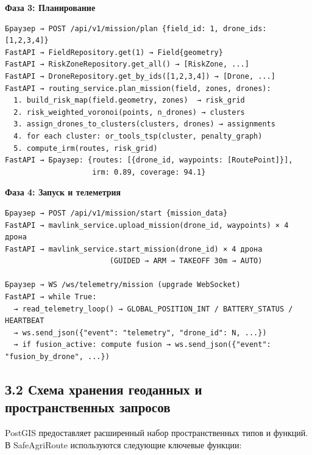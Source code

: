 \documentclass[14pt,a4paper]{extarticle}
\begin{document}
\textbf{Фаза 3: Планирование}

\begin{verbatim}
Браузер → POST /api/v1/mission/plan {field_id: 1, drone_ids: [1,2,3,4]}
FastAPI → FieldRepository.get(1) → Field{geometry}
FastAPI → RiskZoneRepository.get_all() → [RiskZone, ...]
FastAPI → DroneRepository.get_by_ids([1,2,3,4]) → [Drone, ...]
FastAPI → routing_service.plan_mission(field, zones, drones):
  1. build_risk_map(field.geometry, zones)  → risk_grid
  2. risk_weighted_voronoi(points, n_drones) → clusters
  3. assign_drones_to_clusters(clusters, drones) → assignments
  4. for each cluster: or_tools_tsp(cluster, penalty_graph)
  5. compute_irm(routes, risk_grid)
FastAPI → Браузер: {routes: [{drone_id, waypoints: [RoutePoint]}],
                    irm: 0.89, coverage: 94.1}
\end{verbatim}

\textbf{Фаза 4: Запуск и телеметрия}

\begin{verbatim}
Браузер → POST /api/v1/mission/start {mission_data}
FastAPI → mavlink_service.upload_mission(drone_id, waypoints) × 4 дрона
FastAPI → mavlink_service.start_mission(drone_id) × 4 дрона
                        (GUIDED → ARM → TAKEOFF 30m → AUTO)

Браузер → WS /ws/telemetry/mission (upgrade WebSocket)
FastAPI → while True:
  → read_telemetry_loop() → GLOBAL_POSITION_INT / BATTERY_STATUS / HEARTBEAT
  → ws.send_json({"event": "telemetry", "drone_id": N, ...})
  → if fusion_active: compute fusion → ws.send_json({"event": "fusion_by_drone", ...})
\end{verbatim}

\hypertarget{ux437.2-ux441ux445ux435ux43cux430-ux445ux440ux430ux43dux435ux43dux438ux44f-ux433ux435ux43eux434ux430ux43dux43dux44bux445-ux438-ux43fux440ux43eux441ux442ux440ux430ux43dux441ux442ux432ux435ux43dux43dux44bux445-ux437ux430ux43fux440ux43eux441ux43eux432}{%
\subsection{З.2 Схема хранения геоданных и пространственных запросов}\label{ux437.2-ux441ux445ux435ux43cux430-ux445ux440ux430ux43dux435ux43dux438ux44f-ux433ux435ux43eux434ux430ux43dux43dux44bux445-ux438-ux43fux440ux43eux441ux442ux440ux430ux43dux441ux442ux432ux435ux43dux43dux44bux445-ux437ux430ux43fux440ux43eux441ux43eux432}}

PostGIS предоставляет расширенный набор пространственных типов и функций. В SafeAgriRoute используются следующие ключевые функции:
\end{document}
